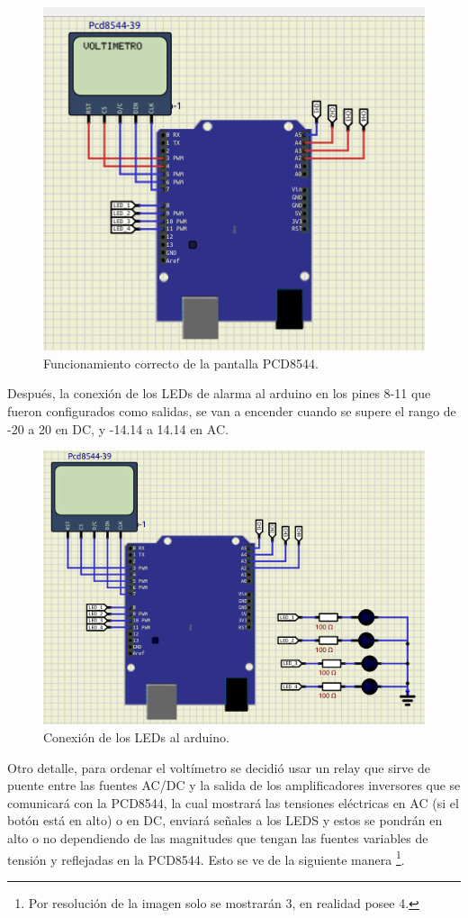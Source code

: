 \begin{figure}[H]
\centering
\includegraphics[width=.8\linewidth]{Imagenes/5.png}
 \caption{Funcionamiento correcto de la pantalla PCD8544.}
 \label{fig5}
\end{figure}
Después, la conexión de los LEDs de alarma al arduino en los pines 8-11 que fueron configurados como salidas, se van a encender cuando se supere el rango de -20 a 20 en DC, y -14.14 a 14.14 en AC.
\begin{figure}[H]
\centering
\includegraphics[width=.8\linewidth]{Imagenes/6.png}
 \caption{Conexión de los LEDs al arduino.}
 \label{fig6}
\end{figure}
Otro detalle, para ordenar el voltímetro se decidió usar un relay que sirve de puente entre las fuentes AC/DC y la salida de los amplificadores inversores que se comunicará con la PCD8544, la cual mostrará las tensiones eléctricas en AC (si el botón está en alto) o en DC, enviará señales a los LEDS y estos se pondrán en alto o no dependiendo de las magnitudes que tengan las fuentes variables de tensión y reflejadas en la PCD8544. Esto se ve de la siguiente manera \footnote{Por resolución de la imagen solo se mostrarán 3, en realidad posee 4.}.
